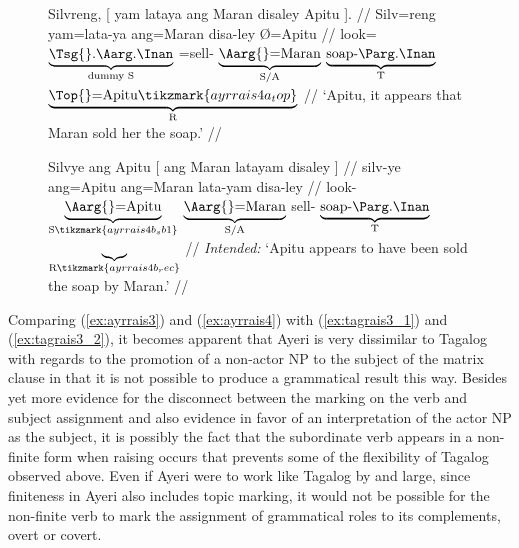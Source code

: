 \begin{figure}
\pex\label{ex:ayrrais4}
\a\label{ex:ayrrais4_1}\begingl[aboveglcskip=1.5em]
	\gla Silvreng, \textup{[} {yam lataya} {ang Maran} disaley Apitu
		\textup{]}. //
	\glb Silv=reng {} yam=lata-ya ang=Maran disa-ley Ø=Apitu {} //
	\glc look=$\underbrace{\text{\smash{\Tsg{}}.\AargI{}}}_{\text{dummy S}}$
		{}
		\DatT{}=sell-\TsgM{}%
		$\underbrace{\text{\Aarg{}=Maran}}_{\text{S/A}}$
		$\underbrace{\text{\smash{soap}-\PargI{}}}_{\text{T}}$
		$\underbrace{\text{\Top{}=\smash{Apitu}}%
			\tikzmark{ayrrais4a_top}%
		}_{\text{R}}$
		{}
		//
	\glft `Apitu, it appears that Maran sold her the soap.' //
\endgl
{}

\a\label{ex:ayrrais4_2}\ljudge*%
\begingl[aboveglftskip=1.75em]
	\gla Silvye {ang Apitu} \textup{[} {ang Maran} latayam disaley {}
		\textup{]} //
	\glb silv-ye ang=Apitu {} ang=Maran lata-yam disa-ley {} {} //
	\glc look-\TsgF{}
		$\underbrace{\text{\Aarg{}=\smash{Apitu}}}_{\text{S}%
			\tikzmark{ayrrais4b_sb1}%
		}$
		{}
		$\underbrace{\text{\Aarg{}=Maran}}_{\text{S/A}}$
		sell-\Ptcp{} 
		$\underbrace{\text{\smash{soap}-\PargI{}}}_{\text{T}}$
		$\underbrace{}_{\text{R}%
			\tikzmark{ayrrais4b_rec}%
		}$
		{} //
	\glft \textit{Intended:} `Apitu appears to have been sold the soap by
		Maran.' //
\endgl
{}

\xe
\end{figure}

Comparing (\ref{ex:ayrrais3}) and (\ref{ex:ayrrais4}) with
(\ref{ex:tagrais3_1}) and (\ref{ex:tagrais3_2}), it becomes apparent that Ayeri
is very dissimilar to Tagalog with regards to the promotion of a non-actor NP
to the subject of the matrix clause in that it is not possible to produce a
grammatical result this way. Besides yet more evidence for the disconnect
between the marking on the verb and subject assignment and also evidence in
favor of an interpretation of the actor NP as the subject, it is possibly the
fact that the subordinate verb appears in a non-finite form when raising occurs
that prevents some of the flexibility of Tagalog observed above. Even if Ayeri
were to work like Tagalog by and large, since finiteness in Ayeri also includes
topic marking, it would not be possible for the non-finite verb to mark the
assignment of grammatical roles to its complements, overt or covert.

